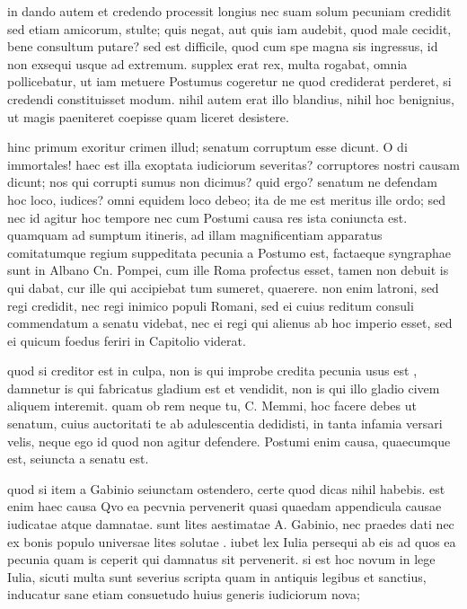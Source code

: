  in dando autem et credendo processit longius nec suam solum pecuniam credidit sed etiam amicorum, stulte; quis negat, aut quis iam audebit, quod male cecidit, bene consultum putare? sed est difficile, quod cum spe magna sis ingressus, id non exsequi usque ad extremum. supplex erat rex, multa rogabat, omnia pollicebatur, ut iam metuere Postumus cogeretur ne quod crediderat perderet, si credendi constituisset modum. nihil autem erat illo blandius, nihil hoc benignius, ut magis paeniteret coepisse quam liceret desistere.

 hinc primum exoritur crimen illud; senatum corruptum esse dicunt. O di immortales! haec est illa exoptata iudiciorum severitas? corruptores nostri causam dicunt; nos qui corrupti sumus non dicimus? quid ergo? senatum ne defendam hoc loco, iudices? omni equidem loco debeo; ita de me est meritus ille ordo; sed nec id agitur hoc tempore nec cum Postumi causa res ista coniuncta est. quamquam ad sumptum itineris, ad illam magnificentiam apparatus comitatumque regium suppeditata pecunia a Postumo est, factaeque syngraphae sunt in Albano Cn. Pompei, cum ille Roma profectus esset, tamen non debuit is qui dabat, cur ille qui accipiebat tum sumeret, quaerere. non enim latroni, sed regi credidit, nec regi inimico populi Romani, sed ei cuius reditum consuli commendatum a senatu videbat, nec ei regi qui alienus ab hoc imperio esset, sed ei quicum foedus feriri in Capitolio viderat.

 quod si creditor est in culpa, non is qui improbe credita pecunia usus est , damnetur is qui fabricatus gladium est et vendidit, non is qui illo gladio civem aliquem interemit. quam ob rem neque tu, C. Memmi, hoc facere debes ut senatum, cuius auctoritati te ab adulescentia dedidisti, in tanta infamia versari velis, neque ego id quod non agitur defendere. Postumi enim causa, quaecumque est, seiuncta a senatu est.

 quod si item a Gabinio seiunctam ostendero, certe quod dicas nihil habebis. est enim haec causa Qvo ea pecvnia pervenerit quasi quaedam appendicula causae iudicatae atque damnatae. sunt lites aestimatae A. Gabinio, nec praedes dati nec ex bonis populo universae lites solutae . iubet lex Iulia persequi ab eis ad quos ea pecunia quam is ceperit qui damnatus sit pervenerit. si est hoc novum in lege Iulia, sicuti multa sunt severius scripta quam in antiquis legibus et sanctius, inducatur sane etiam consuetudo huius generis iudiciorum nova;

